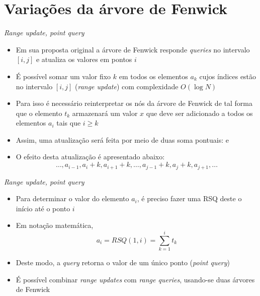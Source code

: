 \section{Variações da árvore de Fenwick}

\begin{frame}[fragile]{\it{Range update, point query}}

    \begin{itemize}
        \item Em sua proposta original a árvore de Fenwick responde \textit{queries} no 
            intervalo $[i, j]$ e atualiza os valores em pontos $i$

        \item É possível somar um valor fixo $k$ em todos os elementos $a_k$ cujos índices estão 
            no intervalo $[i, j]$ (\textit{range update}) com complexidade $O(\log N)$

        \item Para isso é necessário reinterpretar os nós da árvore de Fenwick de tal forma
            que o elemento $t_k$ armazenará um valor $x$ que deve ser adicionado a todos
            os elementos $a_i$ tais que $i\geq k$

        \item Assim, uma atualização  será feita por meio de duas
            soma pontuais:  e 

        \item O efeito desta atualização é apresentado abaixo:
        \[
            \ldots, a_{i - 1}, a_i + k, a_{i + 1} + k, \ldots, a_{j - 1} + k,
                a_j + k, a_{j + 1}, \ldots
        \]
    \end{itemize}

\end{frame}

\begin{frame}[fragile]{\it{Range update, point query}}

    \begin{itemize}
        \item Para determinar o valor do elemento $a_i$, é preciso
            fazer uma RSQ deste o início até o ponto $i$

        \item Em notação matemática,
        \[
            a_i = RSQ(1, i) = \sum_{k = 1}^i t_k
        \]

        \item Deste modo, a \textit{query} retorna o valor de um único ponto
            (\textit{point query})

        \item É possível combinar \textit{range updates} com \textit{range queries},
            usando-se duas árvores de Fenwick
    \end{itemize}

\end{frame}

